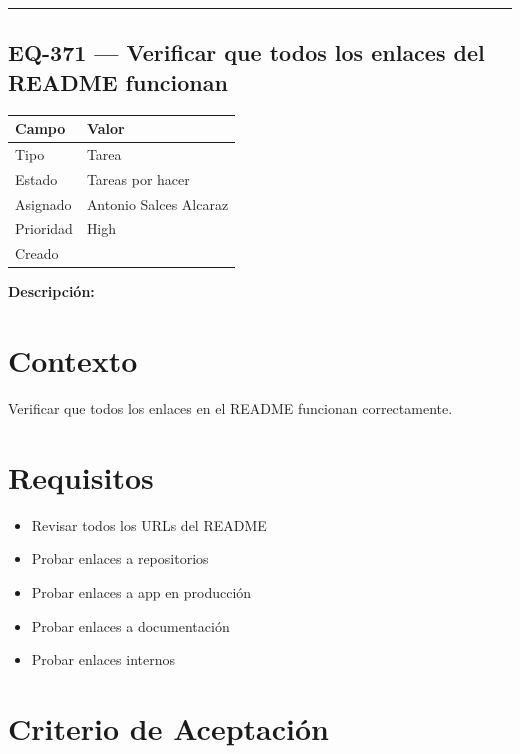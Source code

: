 \documentclass[
  spanish,
  11pt,
]{report}
\newcounter{none} %
\providecommand{\tightlist}{%
  \setlength{\itemsep}{0pt}\setlength{\parskip}{0pt}}
\begin{document}
\begin{center}\rule{0.5\linewidth}{0.5pt}\end{center}

\subsection{EQ-371 --- Verificar que todos los enlaces del README
funcionan}\label{eq-371-verificar-que-todos-los-enlaces-del-readme-funcionan}

{\def\LTcaptype{none} %
\begin{longtable}[]{@{}ll@{}}
\toprule\noalign{}
Campo & Valor \\
\midrule\noalign{}
\endhead
\bottomrule\noalign{}
\endlastfoot
Tipo & Tarea \\
Estado & Tareas por hacer \\
Asignado & Antonio Salces Alcaraz \\
Prioridad & High \\
Creado & \\
\end{longtable}
}

\textbf{Descripción:}

\section{Contexto}\label{contexto-9}

Verificar que todos los enlaces en el README funcionan correctamente.

\section{Requisitos}\label{requisitos-8}

\begin{itemize}
\tightlist
\item
  Revisar todos los URLs del README
\item
  Probar enlaces a repositorios
\item
  Probar enlaces a app en producción
\item
  Probar enlaces a documentación
\item
  Probar enlaces internos
\end{itemize}

\section{Criterio de Aceptación}\label{criterio-de-aceptaciuxf3n-8}
\end{document}
